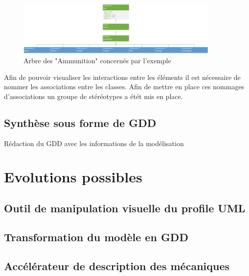 \begin{figure}[H]
    \centering
    \includegraphics[width=10cm]{10_img/chap6/ammunitions.PNG} 
    \caption{Arbre des "Ammunition" concernés par l'exemple}
\end{figure}


Afin de pouvoir visualiser les interactions entre les éléments il est nécessaire de nommer les associations entre les classes. Afin de mettre en place ces nommages d'associations un groupe de stéréotypes a étét mis en place.


\subsection{Synthèse sous forme de GDD}
Rédaction du GDD avec les informations de la modélisation

\section{Evolutions possibles}
\subsection{Outil de manipulation visuelle du profile UML}
\subsection{Transformation du modèle en GDD}
\subsection{Accélérateur de description des mécaniques}







